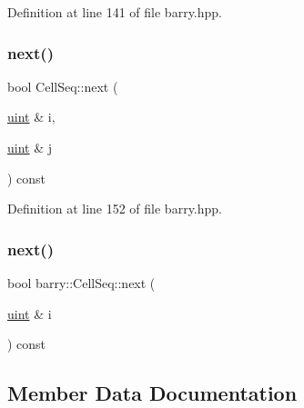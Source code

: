 Definition at line 141 of file barry.\+hpp.

\mbox{\label{classbarry_1_1_cell_seq_a05687b1000bcce13c0f81c0203363ce7}} 
\subsubsection{\texorpdfstring{next()}{next()}\hspace{0.1cm}{\footnotesize\ttfamily [1/2]}}
{\footnotesize\ttfamily bool Cell\+Seq\+::next (\begin{DoxyParamCaption}\item[{\hyperlink{namespacebarry_a11dfc53ddb4672278319aa04f1e09a6c}{uint} \&}]{i,  }\item[{\hyperlink{namespacebarry_a11dfc53ddb4672278319aa04f1e09a6c}{uint} \&}]{j }\end{DoxyParamCaption}) const\hspace{0.3cm}{\ttfamily [inline]}}



Definition at line 152 of file barry.\+hpp.

\mbox{\label{classbarry_1_1_cell_seq_aa294a7d0620ff938150094b0b3e895a5}} 
\subsubsection{\texorpdfstring{next()}{next()}\hspace{0.1cm}{\footnotesize\ttfamily [2/2]}}
{\footnotesize\ttfamily bool barry\+::\+Cell\+Seq\+::next (\begin{DoxyParamCaption}\item[{\hyperlink{namespacebarry_a11dfc53ddb4672278319aa04f1e09a6c}{uint} \&}]{i }\end{DoxyParamCaption}) const}



\subsection{Member Data Documentation}
\mbox{\label{classbarry_1_1_cell_seq_a40aa32ec41df99a1db9a58fe578b543f}} 
